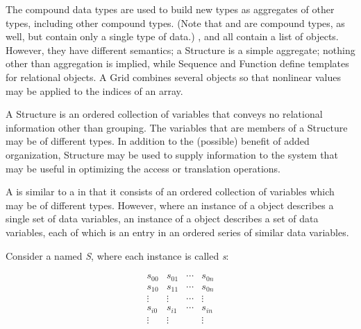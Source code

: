 The compound data types are used to build new types as aggregates of
other types, including other compound types. (Note that 
and  are compound types, as well, but contain only a
single type of data.) ,  and
 all contain a list of  objects.
However, they have different semantics; a Structure is a simple
aggregate; nothing other than aggregation is implied, while Sequence
and Function define templates for relational objects. A Grid combines
several  objects so that nonlinear values may be applied
to the indices of an array.

\begin{description}
  
\item[Structure] A Structure is an ordered collection of variables
  that conveys no relational information other than grouping. The
  variables that are members of a Structure may be of different types.
  In addition to the (possible) benefit of added organization,
  Structure may be used to supply information to the system that may
  be useful in optimizing the access or translation operations.

\item[Sequence] A  is similar to a 
  in that it consists of an ordered collection of variables which may
  be of different types.  However, where an instance of a
   object describes a single set of data variables,
  an instance of a  object describes a set of data
  variables, each of which is an entry in an ordered series of similar
  data variables.

  Consider a  named \emph{S}, where each instance is
  called \emph{s}:

\begin{displaymath} 
\begin{array}{cccc}  
        s_{0 0} & s_{0 1} & \cdots & s_{0 n} \\  
        s_{1 0} & s_{1 1} & \cdots & s_{0 n} \\  
        \vdots  & \vdots  & \cdots & \vdots \\  
        s_{i 0} & s_{i 1} & \cdots & s_{i n} \\
        \vdots  & \vdots  &        & \vdots   
\end{array} 
\end{displaymath}


\end{description}
